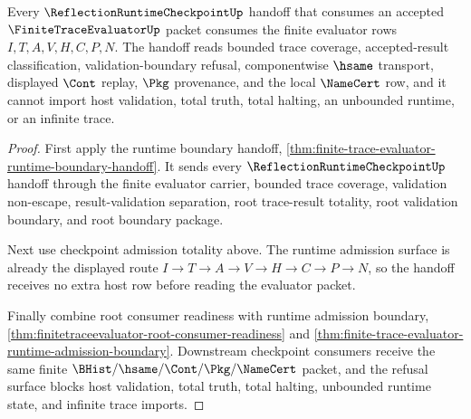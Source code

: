 \begin{theorem}
\label{thm:finitetraceevaluator-root-reflection-checkpoint-handoff}
Every $\ReflectionRuntimeCheckpointUp$ handoff that consumes an accepted
$\FiniteTraceEvaluatorUp$ packet consumes the finite evaluator rows
$I,T,A,V,H,C,P,N$. The handoff reads bounded trace coverage, accepted-result
classification, validation-boundary refusal, componentwise $\hsame$ transport,
displayed $\Cont$ replay, $\Pkg$ provenance, and the local $\NameCert$ row, and
it cannot import host validation, total truth, total halting, an unbounded
runtime, or an infinite trace.
\end{theorem}
\begin{proof}
First apply the runtime boundary handoff,
\autoref{thm:finite-trace-evaluator-runtime-boundary-handoff}. It sends every
$\ReflectionRuntimeCheckpointUp$ handoff through the finite evaluator carrier,
bounded trace coverage, validation non-escape, result-validation separation,
root trace-result totality, root validation boundary, and root boundary
package.

Next use checkpoint admission totality above. The runtime admission surface is
already the displayed route $I \to T \to A \to V \to H \to C \to P \to N$, so
the handoff receives no extra host row before reading the evaluator packet.

Finally combine root consumer readiness with runtime admission boundary,
\autoref{thm:finitetraceevaluator-root-consumer-readiness} and
\autoref{thm:finite-trace-evaluator-runtime-admission-boundary}. Downstream
checkpoint consumers receive the same finite $\BHist/\hsame/\Cont/\Pkg/
\NameCert$ packet, and the refusal surface blocks host validation, total truth,
total halting, unbounded runtime state, and infinite trace imports.
\end{proof}
